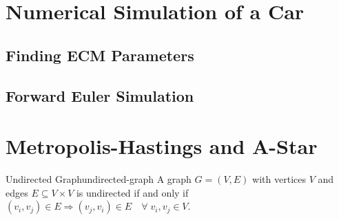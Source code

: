 \documentclass[12pt, a4paper]{article}
\begin{document}
  \section{Numerical Simulation of a Car}
  \subsection{Finding ECM Parameters}
  \begin{figure}[H]
    \captionsetup[subfigure]{justification=centering}
    \centering
    \hfill
    \par
  \end{figure}

  \subsection{Forward Euler Simulation}

  \section{Metropolis-Hastings and A-Star}
  \begin{definition}{Undirected Graph}{undirected-graph}
    A graph $G = (V, E)$ with vertices $V$ and edges $E \subseteq V \times V$ is undirected if and only if $(v_i, v_j) \in E \Rightarrow (v_j, v_i) \in E \quad \forall\; v_i, v_j \in V$.
  \end{definition}
\end{document}
